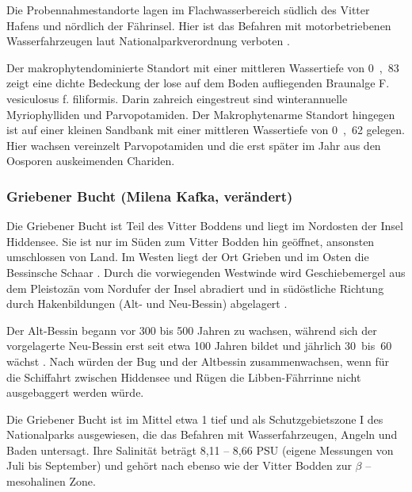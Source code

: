 Die Probennahmestandorte lagen im Flachwasserbereich südlich des Vitter Hafens und nördlich der Fährinsel. Hier ist das Befahren mit motorbetriebenen Wasserfahrzeugen laut Nationalparkverordnung verboten \citep{landesamt_fur_forsten_2002}.

Der makrophytendominierte Standort mit einer mittleren Wassertiefe von \unit{0,83}{\metre} zeigt eine dichte Bedeckung der lose auf dem Boden aufliegenden Braunalge F. vesiculosus f. filiformis. Darin zahreich eingestreut sind winterannuelle Myriophylliden und Parvopotamiden. Der Makrophytenarme Standort hingegen ist auf einer kleinen Sandbank mit einer mittleren Wassertiefe von \unit{0,62}{\metre} gelegen. Hier wachsen vereinzelt Parvopotamiden und die erst später im Jahr aus den Oosporen auskeimenden Chariden. 


\subsubsection{Griebener Bucht (Milena Kafka, verändert)}

Die Griebener Bucht ist Teil des Vitter Boddens und liegt im Nordosten der Insel Hiddensee. Sie ist nur im Süden zum Vitter Bodden hin geöffnet, ansonsten umschlossen von Land. Im Westen liegt der Ort Grieben und im Osten die Bessinsche Schaar \citep{mobus_2000}. Durch die vorwiegenden Westwinde wird  Geschiebemergel aus dem Pleistozän vom Nordufer der Insel abradiert und in südöstliche Richtung durch Hakenbildungen (Alt- und Neu-Bessin) abgelagert \citep{naumann_2012}.

Der Alt-Bessin begann vor 300 bis 500 Jahren zu wachsen, während sich der vorgelagerte Neu-Bessin erst seit etwa 100 Jahren bildet und jährlich \unit{30 bis 60}{\metre} wächst \citep{karge_2007}. Nach \cite{mobus_2000} würden der Bug und der Altbessin zusammenwachsen, wenn für die Schiffahrt zwischen Hiddensee und Rügen die Libben-Fährrinne nicht ausgebaggert werden würde.

Die Griebener Bucht ist im Mittel etwa \unit{1}{\metre} tief \citep{flugge_2004, hendreschke_2009} und als Schutzgebietszone I des Nationalparks ausgewiesen, die das Befahren mit Wasserfahrzeugen, Angeln und Baden untersagt. Ihre Salinität beträgt 8,11 – 8,66 PSU (eigene Messungen von Juli bis September) und gehört nach \cite{gosselck_2011} ebenso wie der Vitter Bodden zur $\beta$ – mesohalinen Zone.

